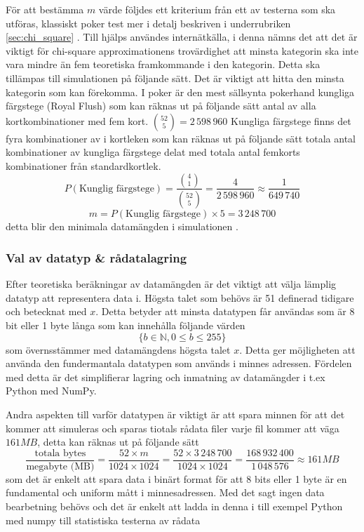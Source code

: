 \documentclass[swedish,a4paper]{article}
\begin{document}
För att bestämma $m$ värde följdes ett kriterium från ett av testerna som ska
utföras, klassiskt poker test mer i  detalj beskriven i underrubriken
\ref{sec:chi_square} . Till hjälps användes \parencite{nist} internätkälla, i
denna nämns det att det är viktigt för chi-square approximationens trovärdighet
att minsta kategorin ska inte vara mindre än fem teoretiska framkommande i den
kategorin. Detta ska tillämpas till simulationen på följande sätt. Det är
viktigt att hitta den minsta kategorin som kan förekomma. I poker är den mest
sällsynta pokerhand kungliga färgstege (Royal Flush) som kan räknas ut på
följande sätt antal av alla kortkombinationer med fem kort. $\binom{52}{5} =
2\,598\,960$ Kungliga färgstege finns det fyra  kombinationer av i kortleken
som kan räknas ut på följande sätt totala antal kombinationer av kungliga
färgstege delat med totala antal femkorts kombinationer från standardkortlek.
$$ P(\text{Kunglig färgstege}) =  \frac{\binom{4}{1}}{\binom{52}{5}} =
\frac{4}{2\,598\,960} \approx \frac{1}{649\,740} $$ $$m = P(\text{Kunglig
färgstege})  \times 5 = 3\,248\,700$$ detta blir den minimala datamängden i simulationen
.

\subsubsection{Val av datatyp \& rådatalagring} Efter teoretiska beräkningar av
datamängden är det viktigt att välja lämplig datatyp att representera data i.
Högsta talet som behövs är 51 definerad tidigare och betecknat med $x$. Detta
betyder att minsta datatypen får användas som är 8 bit eller 1 byte långa som
kan  innehålla följande värden $$\{b \in \mathbb{N},  0 \leq b \leq 255 \}$$ som
överns\-stämmer med datamängdens högsta talet $x$. Detta ger möjligheten att
använda den  fundermantala datatypen som används i minnes adressen. Fördelen med
detta är det simplifierar lagring och inmatning av datamängder i t.ex Python
med NumPy.

Andra aspekten till varför datatypen är viktigt är att spara minnen för att det
kommer att simuleras och sparas tiotals rådata filer varje fil kommer att väga
$161 MB$,
detta kan räknas ut på följande sätt
$$ \frac{\text{totala bytes}}{\text{megabyte (MB)}} = \frac{52 \times m }{1024 \times
1024} = \frac{52 \times 3\,248\,700}{1024 \times 1024} = \frac{168\,932\,400}{1\,048\,576} \approx 161 MB 
$$
som det är enkelt att spara data i binärt format för att 8 bits eller 1 byte
är en fundamental och uniform mått i minnesadressen. Med det sagt ingen data
bearbetning behövs och det är enkelt att ladda in denna i till exempel Python
med numpy till statistiska testerna av rådata
\end{document}
